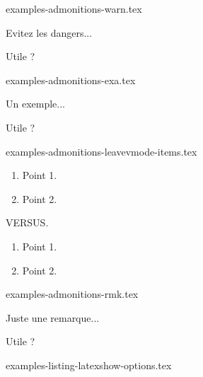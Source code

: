 \begin{filecontents*}[overwrite]{examples-admonitions-warn.tex}
\begin{tdocwarn}
    Evitez les dangers...
\end{tdocwarn}

\begin{tdocwarn}
    Utile ?
\end{tdocwarn}
\end{filecontents*}


\begin{filecontents*}[overwrite]{examples-admonitions-exa.tex}
\begin{tdocexa}
    Un exemple...
\end{tdocexa}

\begin{tdocexa}
    Utile ?
\end{tdocexa}
\end{filecontents*}


\begin{filecontents*}[overwrite]{examples-admonitions-leavevmode-items.tex}
\begin{tdoctip}
    \begin{enumerate}
        \item Point 1.
        \item Point 2.
    \end{enumerate}
\end{tdoctip}
VERSUS.
\begin{tdoctip}
    \begin{enumerate}[wide]
        \item Point 1.
        \item Point 2.
    \end{enumerate}
\end{tdoctip}
\end{filecontents*}


\begin{filecontents*}[overwrite]{examples-admonitions-rmk.tex}
\begin{tdocrem}
    Juste une remarque...
\end{tdocrem}

\begin{tdocrem}
    Utile ?
\end{tdocrem}
\end{filecontents*}


\begin{filecontents*}[overwrite]{examples-listing-latexshow-options.tex}
\end{filecontents*}


